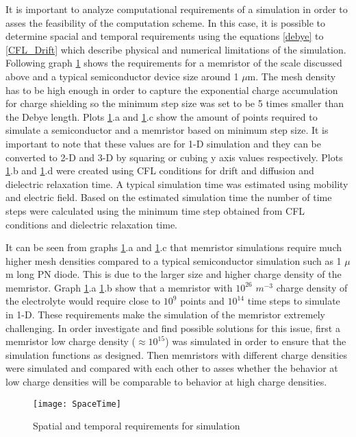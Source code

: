 \begin{doublespace}
It is important to analyze computational requirements of a simulation in order to asses the feasibility of the computation scheme. In this case, it is possible to determine spacial and temporal requirements using the equations \ref{debye} to \ref{CFL_Drift} which describe physical and numerical limitations of the simulation. Following graph \ref{SpaceTime} shows the requirements for a memristor of the scale discussed above and a typical semiconductor device size around 1 $\mu$m. The mesh density has to be high enough in order to capture the exponential charge accumulation for charge shielding so the minimum step size was set to be 5 times smaller than the Debye length. Plots \ref{SpaceTime}.a and \ref{SpaceTime}.c show the amount of points required to simulate a semiconductor and a memristor based on minimum step size. It is important to note that these values are for 1-D simulation and they can be converted to 2-D and 3-D by squaring or cubing y axis values respectively. Plots \ref{SpaceTime}.b and \ref{SpaceTime}.d were created using CFL conditions for drift and diffusion and dielectric relaxation time. A typical simulation time was estimated using mobility and electric field. Based on the estimated simulation time the number of time steps were calculated using the minimum time step obtained from CFL conditions and dielectric relaxation time.

It can be seen from graphs \ref{SpaceTime}.a and \ref{SpaceTime}.c that memristor simulations require much higher mesh densities compared to a typical semiconductor simulation such as 1 $\mu$m long PN diode. This is due to the larger size and higher charge density of the memristor. Graph \ref{SpaceTime}.a \ref{SpaceTime}.b show that a memristor with $10^{26}$ $m^{-3}$ charge density of the electrolyte would require close to $10^9$ points and $10^{14}$ time steps to simulate in 1-D. These requirements make the simulation of the memristor extremely challenging. In order investigate and find possible solutions for this issue, first a memristor low charge density ($\approx 10^{15}$) was simulated in order to ensure that the simulation functions as designed. Then memristors with different charge densities were simulated and compared with each other to asses whether the behavior at low charge densities will be comparable to behavior at high charge densities.

\begin{landscape}
\begin{figure}[htp]
\centering
\texttt{[image: SpaceTime]}
\caption{Spatial and temporal requirements for simulation} 
\label{SpaceTime}
\end{figure}
\end{landscape}



\end{doublespace}
